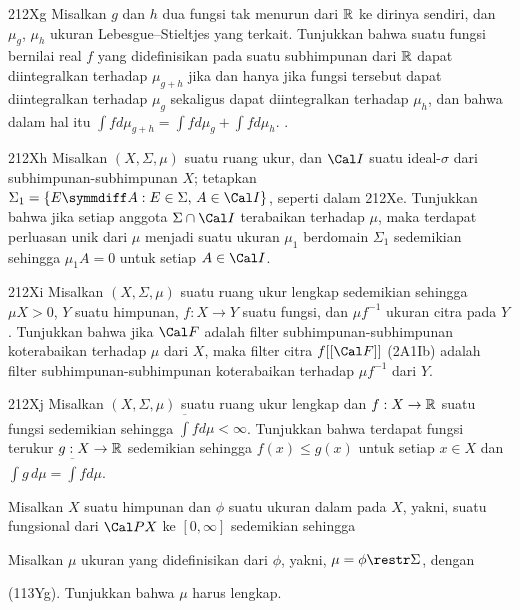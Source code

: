 {\spheader 212Xg
Misalkan $g$ dan $h$ dua fungsi tak menurun dari $\Bbb R$ ke dirinya
sendiri, dan $\mu_g$, $\mu_h$ ukuran Lebesgue--Stieltjes yang terkait.
Tunjukkan bahwa suatu fungsi bernilai real $f$ yang didefinisikan pada
suatu subhimpunan dari $\Bbb R$ dapat diintegralkan terhadap $\mu_{g+h}$ jika dan hanya
jika fungsi tersebut dapat diintegralkan terhadap $\mu_g$ sekaligus
dapat diintegralkan terhadap $\mu_h$, dan bahwa dalam hal itu
$\int fd\mu_{g+h}=\int fd\mu_g+\int fd\mu_h$. .

\spheader 212Xh Misalkan $(X,\Sigma,\mu)$ suatu ruang ukur, dan
$\Cal I$ suatu ideal-$\sigma$ dari subhimpunan-subhimpunan $X$; tetapkan
$\Sigma_1=\{E\symmdiff A:E\in\Sigma,\,A\in\Cal I\}$, seperti dalam
212Xe. Tunjukkan bahwa jika setiap anggota $\Sigma\cap\Cal I$
terabaikan terhadap $\mu$, maka terdapat perluasan unik dari $\mu$ menjadi suatu
ukuran $\mu_1$ berdomain $\Sigma_1$ sedemikian sehingga $\mu_1A=0$
untuk setiap $A\in\Cal I$.

\spheader 212Xi
Misalkan $(X,\Sigma,\mu)$ suatu ruang ukur lengkap sedemikian sehingga
$\mu X>0$, $Y$ suatu himpunan, $f:X\to Y$ suatu fungsi, dan
$\mu f^{-1}$ ukuran citra pada $Y$. Tunjukkan bahwa jika $\Cal F$
adalah filter subhimpunan-subhimpunan koterabaikan terhadap $\mu$ dari $X$, maka
filter citra $f[[\Cal F]]$ (2A1Ib) adalah filter subhimpunan-subhimpunan
koterabaikan terhadap $\mu f^{-1}$ dari $Y$.

\spheader 212Xj
Misalkan $(X,\Sigma,\mu)$ suatu ruang ukur lengkap dan $f:X\to\Bbb R$
suatu fungsi sedemikian sehingga $\overline{\int}fd\mu<\infty$.
Tunjukkan bahwa terdapat fungsi terukur $g:X\to\Bbb R$ sedemikian
sehingga $f(x)\le g(x)$ untuk setiap $x\in X$ dan
$\int g\,d\mu=\overline{\int}fd\mu$.

Misalkan $X$ suatu himpunan dan $\phi$ suatu ukuran dalam pada $X$,
yakni, suatu fungsional dari $\Cal PX$ ke $[0,\infty]$ sedemikian
sehingga




\noindent Misalkan $\mu$ ukuran yang didefinisikan dari $\phi$, yakni,
$\mu=\phi\restr\Sigma$, dengan


\noindent (113Yg). Tunjukkan bahwa $\mu$ harus lengkap.
}%

